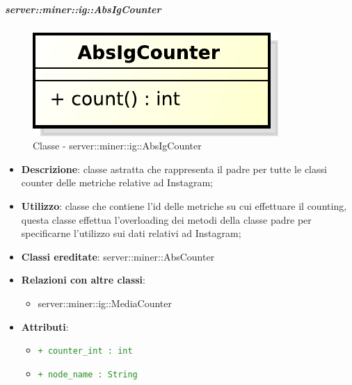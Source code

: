 	\subparagraph{server::miner::ig::AbsIgCounter} %
		\label{subp:server_miner_ig_AbsIgCounter}
		    \begin{figure}[!htbp]
 		 		\centering
 				\centerline{\includegraphics[scale=0.75]{./images/server/classes/miner/abs_ig_counter.pdf}}
 				\caption{Classe - server::miner::ig::AbsIgCounter}
			\end{figure}
			\begin{itemize}
				\item \textbf{Descrizione}: classe astratta che rappresenta il padre per tutte le classi counter delle metriche relative ad Instagram;
				\item \textbf{Utilizzo}: classe che contiene l’id delle metriche su cui effettuare il counting, questa classe effettua l'overloading dei metodi della classe padre per specificarne l’utilizzo sui dati relativi ad Instagram;
				\item \textbf{Classi ereditate}: server::miner::AbsCounter
				\item \textbf{Relazioni con altre classi}:
					\begin{itemize}
						\item server::miner::ig::MediaCounter
					\end{itemize}
				\item \textbf{Attributi}:
					\begin{itemize}
						\item \textcolor{forestgreen}{\texttt{+ counter\_int : int}}
						\item \textcolor{forestgreen}{\texttt{+ node\_name : String}}

\end{itemize}
\end{itemize}

